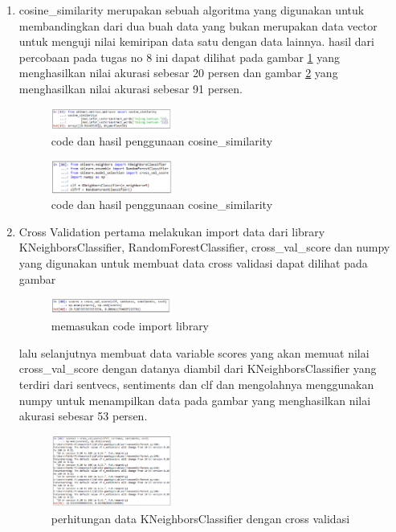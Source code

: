 \begin{enumerate}
        \item cosine\_similarity
        \subitem merupakan sebuah algoritma yang digunakan untuk membandingkan dari dua buah data yang bukan merupakan data vector untuk menguji nilai kemiripan data satu dengan data lainnya. hasil dari percobaan pada tugas no 8 ini dapat dilihat pada gambar \ref{l10} yang menghasilkan nilai akurasi sebesar 20 persen dan gambar \ref{l11} yang menghasilkan nilai akurasi sebesar 91 persen.
        \begin{figure}[H]
            \includegraphics[width=4cm]{figures/1174040/chapter5/30.png}
            \centering
            \caption{code dan hasil penggunaan cosine\_similarity}
            \label{l10}
        \end{figure}
        
        \begin{figure}[H]
            \includegraphics[width=4cm]{figures/1174040/chapter5/31.png}
            \centering
            \caption{code dan hasil penggunaan cosine\_similarity}
            \label{l11}
        \end{figure}
        
        \item Cross Validation
        \subitem pertama melakukan import data dari library KNeighborsClassifier, RandomForestClassifier, cross\_val\_score dan numpy yang digunakan untuk membuat data cross validasi dapat dilihat pada gambar
        \begin{figure}[H]
            \includegraphics[width=4cm]{figures/1174040/chapter5/32.png}
            \centering
            \caption{memasukan code import library}
        \end{figure}
        
        \subitem lalu selanjutnya membuat data variable scores yang akan memuat nilai cross\_val\_score dengan datanya diambil dari KNeighborsClassifier yang terdiri dari sentvecs, sentiments dan clf dan mengolahnya menggunakan numpy untuk menampilkan data pada gambar yang menghasilkan nilai akurasi sebesar 53 persen.
        \begin{figure}[H]
            \includegraphics[width=4cm]{figures/1174040/chapter5/33.png}
            \centering
            \caption{perhitungan data KNeighborsClassifier dengan cross validasi}
        \end{figure}
        

\end{enumerate}
